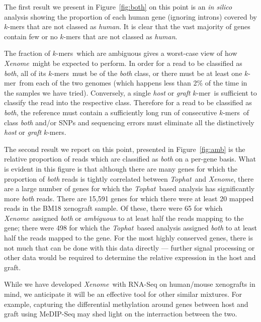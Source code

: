 \documentclass{bioinfo}
\newcommand{\Xenome}{\textit{Xenome}{}}
\newcommand{\Tophat}{\textit{Tophat}{}}
\newcommand{\kmer}{$k$-mer{}}
\newcommand{\kmers}{$k$-mers{}}
\begin{document}
The first result we present in Figure~\ref{fig:both} on this point is
an \textit{in silico} analysis showing the proportion of each human
gene (ignoring introns) covered by $k$-mers that are not classed as
\textit{human}.  It is clear that the vast majority of genes contain few
or no $k$-mers that are not classed as \textit{human}.

The fraction of \kmers\ which are ambiguous gives a worst-case view
of how \Xenome\ might be expected to perform. In order for a read
to be classified as \textit{both}, all of its \kmers\ must be of the
\textit{both} class, or there must be at least one \kmer\  from each of the
two genomes (which happens less than 2\% of the time in the samples we
have tried).  Conversely, a single \textit{host} or \textit{graft} \kmer\
is sufficient to classify the read into the respective class. Therefore
for a read to be classified as \textit{both}, the reference must contain
a sufficiently long run of consecutive \kmers\ of class \textit{both}
and/or SNPs and sequencing errors must eliminate all the distinctively
\textit{host} or \textit{graft} \kmers.

The second result we report on this point, presented in Figure~\ref{fig:amb}
is the relative proportion of reads which are classified as \textit{both}
on a per-gene basis. What is evident in this figure is that although there
are many genes for which the proportion of \textit{both} reads is tightly
correlated between \Tophat\ and \Xenome, there are a large number of genes for which the \Tophat\ based
analysis has significantly more \textit{both} reads. There are 15,591 genes
for which there were at least 20 mapped reads in the BM18 xenograft sample.
Of these, there were 65 for which \Xenome\ assigned 
\textit{both} or \textit{ambiguous} to at least half the reads mapping to the gene;
there were 498 for which the \Tophat\ based analysis assigned \textit{both}
to at least half the reads mapped to the gene.
For the most highly conserved genes, there is not much that can be done
with this data directly --- further signal processing or other data would be required to determine the
relative expression in the host and graft.

While we have developed \Xenome\  with RNA-Seq on human/mouse xenografts in mind,
we anticipate it will be an effective tool for other similar mixtures.
For example, capturing the differential methylation around genes between
host and graft using MeDIP-Seq may shed light on the interraction between
the two.
\end{document}
